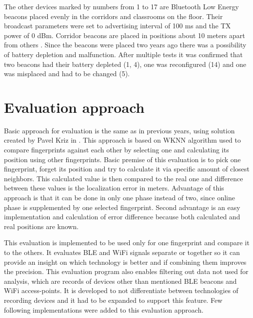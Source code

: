 The other devices marked by numbers from 1 to 17 are Bluetooth Low Energy beacons placed evenly in the corridors and classrooms on the floor. Their broadcast parameters were set to advertising interval of 100 ms and the TX power of 0 dBm. Corridor beacons are placed in positions about 10 meters apart from others \cite{IILUBLEB}. Since the beacons were placed two years ago there was a possibility of battery depletion and malfunction. After multiple tests it was confirmed that two beacons had their battery depleted (1, 4), one was reconfigured (14) and one was misplaced and had to be changed (5).

\section{Evaluation approach}\label{sec:EvaluationApproach}
Basic approach for evaluation is the same as in previous years, using solution created by Pavel Kriz in \cite{IILUBLEB}. This approach is based on WKNN algorithm used to compare fingerprints against each other by selecting one and calculating its position using other fingerprints. Basic premise of this evaluation is to pick one fingerprint, forget its position and try to calculate it via specific amount of closest neighbors. This calculated value is then compared to the real one and difference between these values is the localization error in meters. Advantage of this approach is that it can be done in only one phase instead of two, since online phase is supplemented by one selected fingerprint. Second advantage is an easy implementation and calculation of error difference because both calculated and real positions are known.

This evaluation is implemented to be used only for one fingerprint and compare it to the others. It evaluates BLE and WiFi signals separate or together so it can provide an insight on which technology is better and if combining them improves the precision. This evaluation program also enables filtering out data not used for analysis, which are records of devices other than mentioned BLE beacons and WiFi access-points. It is developed to not differentiate between technologies of recording devices and it had to be expanded to support this feature. Few following implementations were added to this evaluation approach.

